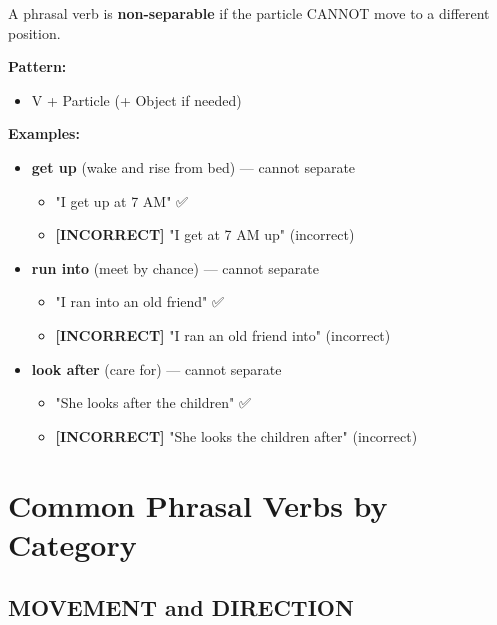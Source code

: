 \begin{grammarbox}[title=Non-Separable (Intransitive) Phrasal Verbs]
A phrasal verb is \textbf{non-separable} if the particle CANNOT move to a different position.

\textbf{Pattern:}
\begin{itemize}
    \item V + Particle (+ Object if needed)
\end{itemize}

\textbf{Examples:}
\begin{itemize}
    \item \textbf{get up} (wake and rise from bed) — cannot separate
    \begin{itemize}
        \item "I get up at 7 AM" ✅
        \item \textbf{[INCORRECT]} "I get at 7 AM up" (incorrect)
    \end{itemize}
    \item \textbf{run into} (meet by chance) — cannot separate
    \begin{itemize}
        \item "I ran into an old friend" ✅
        \item \textbf{[INCORRECT]} "I ran an old friend into" (incorrect)
    \end{itemize}
    \item \textbf{look after} (care for) — cannot separate
    \begin{itemize}
        \item "She looks after the children" ✅
        \item \textbf{[INCORRECT]} "She looks the children after" (incorrect)
    \end{itemize}
\end{itemize}
\end{grammarbox}

\section{Common Phrasal Verbs by Category}

\subsection{MOVEMENT and DIRECTION}

